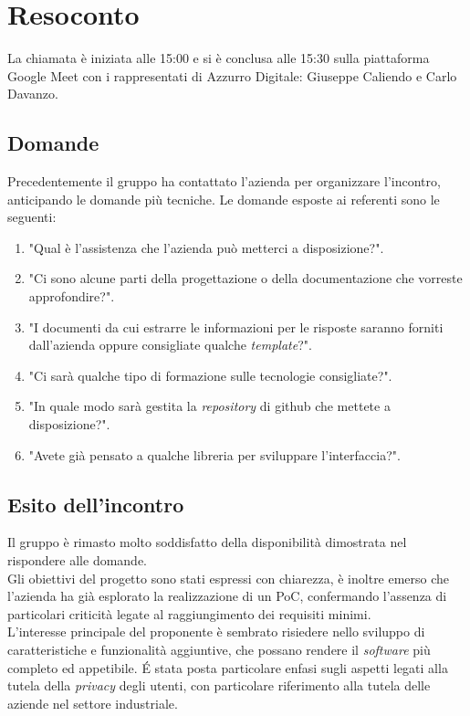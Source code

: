 \section{Resoconto}
La chiamata è iniziata alle 15:00 e si è conclusa alle 15:30 sulla piattaforma Google Meet con i rappresentati di Azzurro Digitale: Giuseppe Caliendo e Carlo Davanzo. \\

\subsection{Domande}
Precedentemente il gruppo ha contattato l'azienda per organizzare l'incontro, anticipando le domande più tecniche.
Le domande esposte ai referenti sono le seguenti:
\begin{enumerate}
	\item "Qual è l'assistenza che l'azienda può metterci a disposizione?".
	\item "Ci sono alcune parti della progettazione o della documentazione che vorreste approfondire?".
	\item "I documenti da cui estrarre le informazioni per le risposte saranno forniti dall'azienda oppure consigliate qualche \textit{template}?".
	\item "Ci sarà qualche tipo di formazione sulle tecnologie consigliate?".
	\item "In quale modo sarà gestita la \textit{repository} di github che mettete a disposizione?".
	\item "Avete già pensato a qualche libreria per sviluppare l'interfaccia?".
\end{enumerate}

\subsection{Esito dell'incontro}
Il gruppo è rimasto molto soddisfatto della disponibilità dimostrata nel rispondere alle domande. \\  
Gli obiettivi del progetto sono stati espressi con chiarezza, è inoltre emerso che l'azienda ha già esplorato la realizzazione di un PoC, confermando l'assenza di particolari criticità legate al raggiungimento dei requisiti minimi. \\
L'interesse principale del proponente è sembrato risiedere nello sviluppo di caratteristiche e funzionalità aggiuntive, che possano rendere il \textit{software} più completo ed appetibile.
\'E stata posta particolare enfasi sugli aspetti legati alla tutela della \textit{privacy} degli utenti, con particolare riferimento alla tutela delle aziende nel settore industriale.\\

